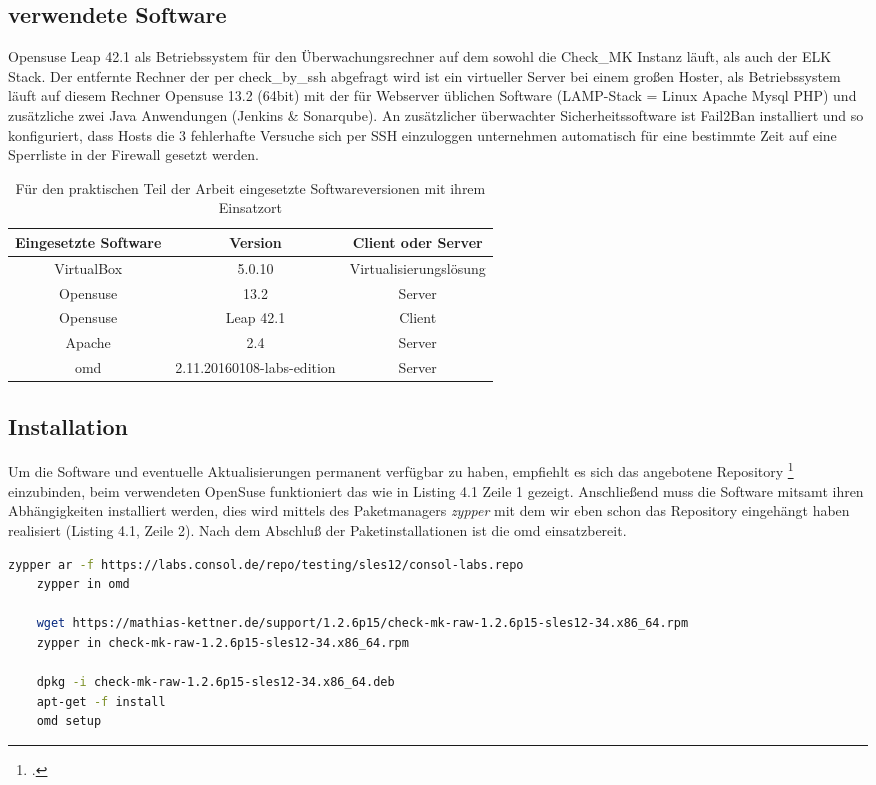 \documentclass[12pt,a4paper,parskip]{scrreprt}
\begin{document}
	\subsection{verwendete Software}
	Opensuse Leap 42.1 als Betriebssystem für den Überwachungsrechner auf dem sowohl die Check\_MK Instanz läuft, als auch der ELK Stack. Der entfernte Rechner der per check\_by\_ssh abgefragt wird ist ein virtueller Server bei einem großen Hoster, als Betriebssystem läuft auf diesem Rechner Opensuse 13.2 (64bit) mit der für Webserver üblichen Software (LAMP-Stack = Linux Apache Mysql PHP) und zusätzliche zwei Java Anwendungen (Jenkins \& Sonarqube). An zusätzlicher überwachter Sicherheitssoftware ist Fail2Ban installiert und so konfiguriert, dass Hosts die 3 fehlerhafte Versuche sich per SSH einzuloggen unternehmen automatisch für eine bestimmte Zeit auf eine Sperrliste in der Firewall gesetzt werden. \\
	\begin{table}[h] %
	\begin{center}
	\begin{tabular}{|c|c|c|}
	\hline 
	Eingesetzte Software & Version & Client oder Server \\ 
	\hline 
	VirtualBox & 5.0.10 & Virtualisierungslösung\\
	\hline
	Opensuse & 13.2 & Server\\ 
	\hline 
	Opensuse & Leap 42.1 & Client\\
	\hline
	Apache & 2.4 & Server\\
	\hline
	\acrshort{omd} & 2.11.20160108-labs-edition & Server\\
	\hline
	\end{tabular} 
	\caption[Eingesetzte Softwareversionen]{Für den praktischen Teil der Arbeit eingesetzte Softwareversionen mit ihrem Einsatzort}
	\end{center}
	\end{table}
	\subsection{Installation}
	Um die Software und eventuelle Aktualisierungen permanent verfügbar zu haben, empfiehlt es sich das angebotene Repository \footcite{omdrepo} einzubinden, beim verwendeten OpenSuse funktioniert das wie in Listing 4.1 Zeile 1 gezeigt. Anschließend muss die Software mitsamt ihren Abhängigkeiten installiert werden, dies wird mittels des Paketmanagers \textit{zypper} mit dem wir eben schon das Repository eingehängt haben realisiert (Listing 4.1, Zeile 2). Nach dem Abschluß der Paketinstallationen ist die \acrshort{omd} einsatzbereit.
	\begin{lstlisting}[language=bash, caption=Konfiguration eines Repositories und Installation der \acrfull{omd}]
	zypper ar -f https://labs.consol.de/repo/testing/sles12/consol-labs.repo
	zypper in omd
	
	wget https://mathias-kettner.de/support/1.2.6p15/check-mk-raw-1.2.6p15-sles12-34.x86_64.rpm
	zypper in check-mk-raw-1.2.6p15-sles12-34.x86_64.rpm
	
	dpkg -i check-mk-raw-1.2.6p15-sles12-34.x86_64.deb
	apt-get -f install
	omd setup
	\end{lstlisting}
\end{document}
